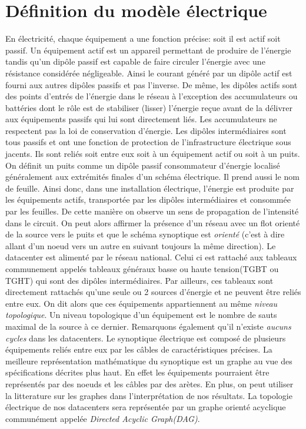 \documentclass[onecolumn, 12pt]{article}
\begin{document}
\section {D\'efinition du mod\`ele \'electrique}
En \'electricit\'e, chaque \'equipement a une fonction pr\'ecise: soit il est actif soit passif. Un \'equipement actif est un appareil permettant de produire de l'\'energie tandis qu'un dip\^ole passif est capable de faire circuler l'\'energie avec une r\'esistance consid\'er\'ee n\'egligeable. Ainsi le courant g\'en\'er\'e par un dip\^ole actif est fourni aux autres dip\^oles passifs et pas l'inverse. 
De m\^eme, les dip\^oles actifs sont des points d'entr\'es de l'\'energie dans le r\'eseau  \`a l'exception des accumulateurs ou batt\'eries dont le r\^ole est de stabiliser (lisser) l'\'energie re\c cue avant de la d\'elivrer aux \'equipements passifs qui lui sont directement li\'es. Les accumulateurs ne respectent pas la loi de conservation d'\'energie. \newline
Les dip\^oles interm\'ediaires sont tous passifs et ont une fonction de protection de l'infrastructure \'electrique sous jacents. 
Ils sont reli\'es soit entre eux soit \`a un \'equipement actif ou soit \`a un puits.
On d\'efinit un puits comme un dip\^ole passif consommateur d'\'energie localis\'e g\'en\'eralement aux extr\'emit\'es finales d'un sch\'ema \'electrique. Il prend aussi le nom de feuille.
Ainsi donc, dans une installation \'electrique, l'\'energie est produite par les \'equipements actifs, transport\'ee par les  dip\^oles interm\'ediaires et consomm\'ee par les feuilles.
De cette mani\`ere on observe  un sens de propagation de l'intensit\'e dans le circuit. On peut alors affirmer la pr\'esence d'un r\'eseau avec un flot orient\'e de la source vers le puits et que le sch\'ema synoptique est \textit{orient\'e} (c'est \`a dire allant d'un noeud vers un autre en suivant toujours la m\^eme direction). \newline
Le datacenter est aliment\'e par le r\'eseau national. Celui ci est rattach\'e aux tableaux communement appel\'es tableaux g\'en\'eraux basse ou haute tension(TGBT ou TGHT)  qui sont des dip\^oles interm\'ediaires.  Par ailleurs, ces tableaux sont directement rattach\'es qu'une seule ou 2 sources d'\'energie et ne peuvent \^etre reli\'es entre eux. On dit alors que ces \'equipements appartiennent au m\^eme \emph{niveau topologique}. Un niveau topologique d'un \'equipement est  le nombre de sauts maximal de la source \`a ce dernier. Remarquons \'egalement qu'il n'existe \emph{aucuns cycles} dans les datacenters.\newline
Le synoptique \'electrique est compos\'e de plusieurs \'equipements reli\'es entre eux par les c\^ables de caract\'eristiques pr\'ecises. La meilleure repr\'esentation math\'ematique du synoptique est un graphe au vue des sp\'ecifications d\'ecrites plus haut. En effet les \'equipements pourraient \^etre repr\'esent\'es par des noeuds et les c\^ables par des ar\`etes. En plus, on peut utiliser la litterature sur les graphes dans l'interpr\'etation de nos r\'esultats.\newline
La topologie \'electrique de nos datacenters sera repr\'esent\'ee par un graphe orient\'e acyclique commun\'ement appel\'ee \emph{Directed Acyclic Graph(DAG)}. 
\end{document}

